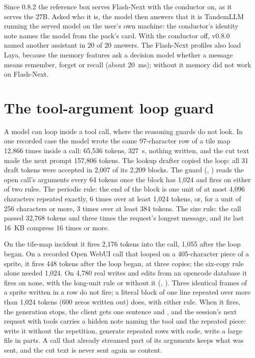 Since 0.8.2 the reference box serves Flash-Next with the conductor on, as it serves the 27B. Asked who it is, the model then answers that it is TandemLLM running the served model on the user's own machine: the conductor's identity note names the model from the pack's card. With the conductor off, v0.8.0 named another assistant in 20 of 20 answers. The Flash-Next profiles also load Laya, because the memory features ask a decision model whether a message means remember, forget or recall (about 20~ms); without it memory did not work on Flash-Next.

\section{The tool-argument loop guard}\label{sec:argloop}

A model can loop inside a tool call, where the reasoning guards do not look. In one recorded case the model wrote the same 97-character row of a tile map 12,866 times inside a  call: 65,536 tokens, 327~s, nothing written, and the cut text made the next prompt 157,806 tokens. The lookup drafter copied the loop: all 31 draft tokens were accepted in 2,007 of its 2,209 blocks. The guard (, ) reads the open call's arguments every 64 tokens once the block has 1,024 and fires on either of two rules. The periodic rule: the end of the block is one unit of at most 4,096 characters repeated exactly, 6 times over at least 1,024 tokens, or, for a unit of 256 characters or more, 3 times over at least 384 tokens. The size rule: the call passed 32,768 tokens and three times the request's longest message, and its last 16~KB compress 16 times or more.

On the tile-map incident it fires 2,176 tokens into the call, 1,055 after the loop began. On a recorded Open WebUI call that looped on a 405-character piece of a sprite, it fires 448 tokens after the loop began, at three copies; the six-copy rule alone needed 1,024. On 4,780 real writes and edits from an opencode database it fires on none, with the long-unit rule or without it (\measured, ). Three identical frames of a sprite written in a row do not fire; a literal block of one line repeated over more than 1,024 tokens (600 zeros written out) does, with either rule. When it fires, the generation stops, the client gets one sentence and , and the session's next request with tools carries a hidden note naming the tool and the repeated piece: write it without the repetition, generate repeated rows with code, write a large file in parts. A call that already streamed part of its arguments keeps what was sent, and the cut text is never sent again as content.


